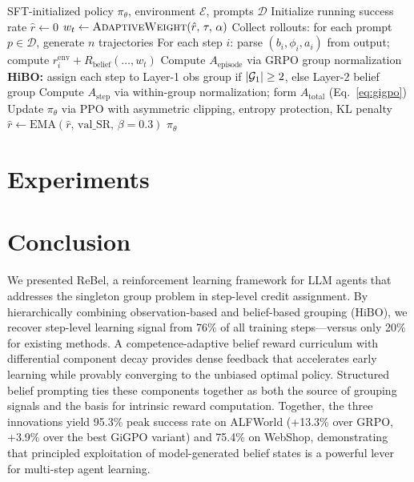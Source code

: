 \documentclass{article}
\begin{document}
\begin{algorithm}[t]
\caption{ReBel Training}
\label{alg:rebel}
\begin{algorithmic}[1]
\REQUIRE SFT-initialized policy $\pi_\theta$, environment $\mathcal{E}$, prompts $\mathcal{D}$
\STATE Initialize running success rate $\hat{r} \leftarrow 0$
  \STATE $w_t \leftarrow \textsc{AdaptiveWeight}(\hat{r},\, \tau,\, \alpha)$ \hfill{}
  \STATE Collect rollouts: for each prompt $p \in \mathcal{D}$, generate $n$ trajectories
  \STATE For each step $i$: parse $(b_i, \phi_i, a_i)$ from output; compute $r_i^{\text{env}} + R_{\text{belief}}(\ldots, w_t)$
  \STATE Compute $A_{\text{episode}}$ via GRPO group normalization
  \STATE \textbf{HiBO:} assign each step to Layer-1 obs group if $|{\cal G}_1| \geq 2$, else Layer-2 belief group
  \STATE Compute $A_{\text{step}}$ via within-group normalization; form $A_{\text{total}}$ (Eq.~\ref{eq:gigpo})
  \STATE Update $\pi_\theta$ via PPO with asymmetric clipping, entropy protection, KL penalty
    \STATE $\hat{r} \leftarrow \text{EMA}(\hat{r},\, \text{val\_SR},\, \beta{=}0.3)$
  \ENDIF
\ENDFOR
\RETURN $\pi_\theta$
\end{algorithmic}
\end{algorithm}


\section{Experiments}
\label{sec:experiments}




\section{Conclusion}
\label{sec:conclusion}

We presented ReBel, a reinforcement learning framework for LLM agents that
addresses the singleton group problem in step-level credit assignment.
By hierarchically combining observation-based and belief-based grouping (HiBO),
we recover step-level learning signal from 76\% of all training steps---versus
only 20\% for existing methods.
A competence-adaptive belief reward curriculum with differential component decay
provides dense feedback that accelerates early learning while provably converging
to the unbiased optimal policy.
Structured belief prompting ties these components together as both the source of
grouping signals and the basis for intrinsic reward computation.
Together, the three innovations yield 95.3\% peak success rate on ALFWorld
(+13.3\% over GRPO, +3.9\% over the best GiGPO variant) and 75.4\% on WebShop,
demonstrating that principled exploitation of model-generated belief states is
a powerful lever for multi-step agent learning.
\end{document}
